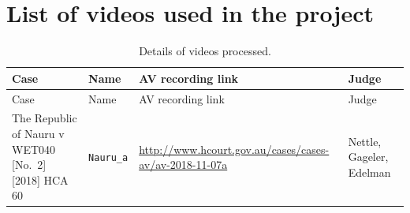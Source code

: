 \documentclass{monashthesis}
\begin{document}
\hypertarget{list-of-videos-used-in-the-project}{%
\section{List of videos used in the project}\label{list-of-videos-used-in-the-project}}

\begin{longtable}[]{@{}llll@{}}
\caption{Details of videos processed.}\tabularnewline
\toprule
\begin{minipage}[b]{0.22\columnwidth}\raggedright
Case\strut
\end{minipage} & \begin{minipage}[b]{0.15\columnwidth}\raggedright
Name\strut
\end{minipage} & \begin{minipage}[b]{0.30\columnwidth}\raggedright
AV recording link\strut
\end{minipage} & \begin{minipage}[b]{0.22\columnwidth}\raggedright
Judge\strut
\end{minipage}\tabularnewline
\midrule
\endfirsthead
\toprule
\begin{minipage}[b]{0.22\columnwidth}\raggedright
Case\strut
\end{minipage} & \begin{minipage}[b]{0.15\columnwidth}\raggedright
Name\strut
\end{minipage} & \begin{minipage}[b]{0.30\columnwidth}\raggedright
AV recording link\strut
\end{minipage} & \begin{minipage}[b]{0.22\columnwidth}\raggedright
Judge\strut
\end{minipage}\tabularnewline
\midrule
\endhead
\begin{minipage}[t]{0.22\columnwidth}\raggedright
The Republic of Nauru v WET040 {[}No.~2{]} {[}2018{]} HCA 60\strut
\end{minipage} & \begin{minipage}[t]{0.15\columnwidth}\raggedright
\texttt{Nauru\_a}\strut
\end{minipage} & \begin{minipage}[t]{0.30\columnwidth}\raggedright
\url{http://www.hcourt.gov.au/cases/cases-av/av-2018-11-07a}\strut
\end{minipage} & \begin{minipage}[t]{0.22\columnwidth}\raggedright
Nettle, Gageler, Edelman\strut
\end{minipage}\tabularnewline

\end{longtable}
\end{document}
